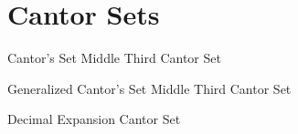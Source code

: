 \section{Cantor Sets}

\begin{definition}{Cantor's Set}
    Middle Third Cantor Set
\end{definition}

\begin{definition}{Generalized Cantor's Set}
    Middle Third Cantor Set
\end{definition}

\begin{example}{Decimal Expansion Cantor Set}
    
\end{example}
